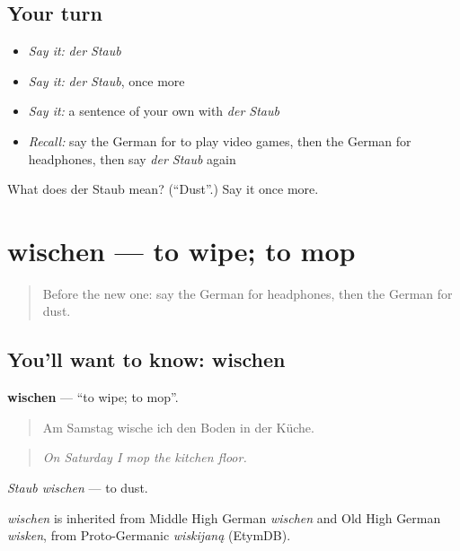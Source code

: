 \subsection*{Your turn}
\begin{itemize}
\raggedright
  \item \emph{Say it:} \emph{der Staub}
  \item \emph{Say it:} \emph{der Staub}, once more
  \item \emph{Say it:} a sentence of your own with \emph{der Staub}
  \item \emph{Recall:} say the German for to play video games, then the German for headphones, then say \emph{der Staub} again
\end{itemize}

\begin{tcolorbox}[breakable,colback=teal!4,colframe=teal!35!black,title={Before you move on}]
What does der Staub mean? (\textquotedblleft{}Dust\textquotedblright{}.) Say it once more.
\end{tcolorbox}
\section[wischen]{wischen — to wipe; to mop}

\label{lesson:GE-C526-wischen}



\begin{quote}
Before the new one: say the German for headphones, then the German for dust.
\end{quote}

\subsection*{You'll want to know: wischen}
\textbf{wischen} — \textquotedblleft{}to wipe; to mop\textquotedblright{}.

\begin{quote}
Am Samstag wische ich den Boden in der Küche.
\end{quote}

\begin{quote}
\emph{On Saturday I mop the kitchen floor.}
\end{quote}

\emph{Staub wischen} — to dust.

\begin{cousinweb}
\emph{wischen} is inherited from Middle High German \emph{wischen} and Old High German \emph{wisken}, from Proto-Germanic \emph{wiskijaną} (EtymDB).
\end{cousinweb}

